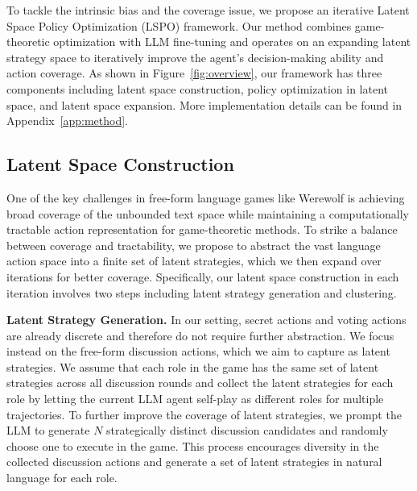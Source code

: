 
To tackle the intrinsic bias and the coverage issue,
we propose an iterative Latent Space Policy Optimization (LSPO) framework. Our method combines game-theoretic optimization with LLM fine-tuning and operates on an expanding latent strategy space to iteratively improve the agent's decision-making ability and action coverage. As shown in Figure~\ref{fig:overview}, our framework has three components including latent space construction, policy optimization in latent space, and latent space expansion. More implementation details can be found in Appendix~\ref{app:method}.

\subsection{Latent Space Construction}

One of the key challenges in free-form language games like Werewolf is achieving broad coverage of the unbounded text space while maintaining a computationally tractable action representation for game-theoretic methods. To strike a balance between coverage and tractability, we propose to abstract the vast language action space into a finite set of latent strategies, which we then expand over iterations for better coverage. Specifically, our latent space construction in each iteration involves two steps including latent strategy generation and clustering.

\textbf{Latent Strategy Generation.}
In our setting, secret actions and voting actions are already discrete and therefore do not require further abstraction. We focus instead on the free-form discussion actions, which we aim to capture as latent strategies. We assume that each role in the game has the same set of latent strategies across all discussion rounds and collect the latent strategies for each role by letting the current LLM agent self-play as different roles for multiple trajectories.
To further improve the coverage of latent strategies, we prompt the LLM to generate $N$ strategically distinct discussion candidates and randomly choose one to execute in the game. This process encourages diversity in the collected discussion actions and generate a set of latent strategies in natural language for each role. 

